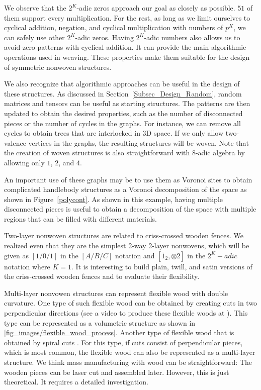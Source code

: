 \documentclass[times,twocolumn,final]{elsarticle}
\begin{document}
We observe that the $2^K$-adic zeros approach our goal as closely as possible. $51$ of them support every multiplication. For the rest, as long as we limit ourselves to cyclical addition, negation, and cyclical multiplication with numbers of $p^K$, we can safely use other $2^K$-adic zeros. Having $2^K$-adic numbers also allows us to avoid zero patterns with cyclical addition. It can provide the main algorithmic operations used in weaving. These properties make them suitable for the design of symmetric nonwoven structures. 

We also recognize that algorithmic approaches can be useful in the design of these structures. As discussed in Section~\ref{Subsec_Design_Random}, random matrices and tensors can be useful as starting structures. The patterns are then updated to obtain the desired properties, such as the number of disconnected pieces or the number of cycles in the graphs. For instance, we can remove all cycles to obtain trees that are interlocked in 3D space. If we only allow two-valence vertices in the graphs, the resulting structures will be woven. Note that the creation of woven structures is also straightforward with $8$-adic algebra by allowing only $1$, $2$, and $4$. 

An important use of these graphs may be to use them as Voronoi sites to obtain complicated handlebody structures as a Voronoi decomposition of the space as shown in Figure~\ref{polycont}. As shown in this example, having multiple disconnected pieces is useful to obtain a decomposition of the space with multiple regions that can be filled with different materials. 

Two-layer nonwoven structures are related to criss-crossed wooden fences. We realized even that they are the simplest 2-way 2-layer nonwovens, which will be given as $[1/0/1]$ in the $[A/B/C]$ notation and $[\overline{1}_{2}, \otimes 2]$ in the $2^K-adic$ notation where $K=1$. It is interesting to build plain, twill, and satin versions of the criss-crossed wooden fences and to evaluate their flexibility.

Multi-layer nonvowen structures can represent flexible wood with double curvature. One type of such flexible wood can be obtained by creating cuts in two perpendicular directions (see a video to produce these flexible woods at \cite{smith2022unique}). This type can be represented as a volumetric structure as shown in \ref{fig_images/flexible_wood_process}. Another type of flexible wood that is obtained by spiral cuts \cite{zarrinmehr2017interlocked}. For this type, if cuts consist of perpendicular pieces, which is most common, the flexible wood can also be represented as a multi-layer structure. We think mass manufacturing with wood can be straightforward: The wooden pieces can be laser cut and assembled later. However, this is just theoretical. It requires a detailed investigation.
\end{document}
